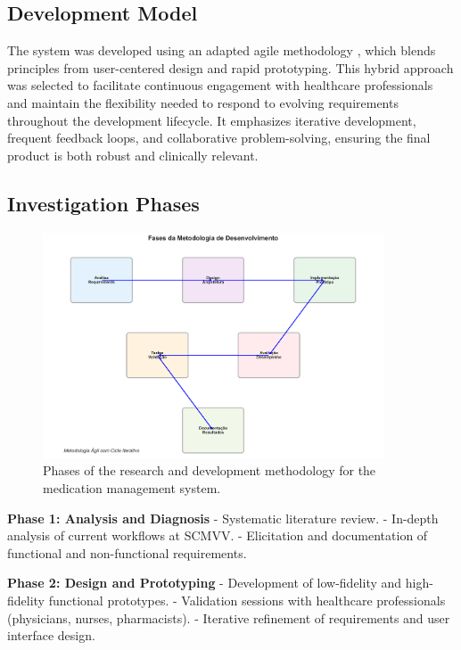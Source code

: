 \subsection{Development Model}

The system was developed using an adapted agile methodology \cite{fowler2018}, which blends principles from user-centered design and rapid prototyping. This hybrid approach was selected to facilitate continuous engagement with healthcare professionals and maintain the flexibility needed to respond to evolving requirements throughout the development lifecycle. It emphasizes iterative development, frequent feedback loops, and collaborative problem-solving, ensuring the final product is both robust and clinically relevant.

\subsection{Investigation Phases}

\begin{figure}[htbp]
    \centering
    \includegraphics[width=0.9\textwidth]{images/generated/methodology_phases.png}
    \caption{Phases of the research and development methodology for the medication management system.}
    \label{fig:methodology_phases}
\end{figure}

\textbf{Phase 1: Analysis and Diagnosis}
- Systematic literature review.
- In-depth analysis of current workflows at SCMVV.
- Elicitation and documentation of functional and non-functional requirements.

\textbf{Phase 2: Design and Prototyping}
- Development of low-fidelity and high-fidelity functional prototypes.
- Validation sessions with healthcare professionals (physicians, nurses, pharmacists).
- Iterative refinement of requirements and user interface design.

